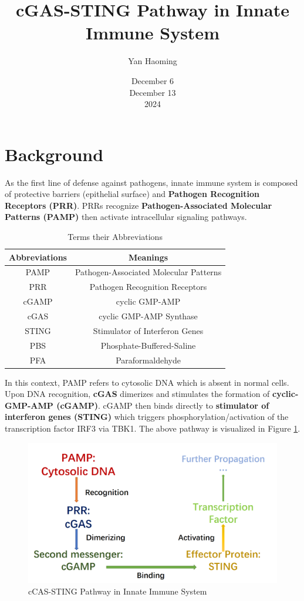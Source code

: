 \documentclass[UTF-8]{article}
\title{cGAS-STING Pathway in Innate Immune System}
\author{Yan Haoming}
\date{December 6\\ December 13\\ 2024}
\begin{document}
\maketitle

\section{Background}
As the first line of defense against pathogens, innate immune system is composed of protective barriers (epithelial surface) and \textbf{Pathogen Recognition Receptors (PRR)}\cite{TheCell}.
PRRs recognize \textbf{Pathogen-Associated Molecular Patterns (PAMP)} then activate intracellular signaling pathways.

\begin{table}[h]
    \centering
    \begin{tabular}{|c|c|}\hline
        \textbf{Abbreviations} & \textbf{Meanings} \\ \hline
        PAMP & Pathogen-Associated Molecular Patterns\\ \hline
        PRR & Pathogen Recognition Receptors \\ \hline
        cGAMP & cyclic GMP-AMP \\ \hline
        cGAS & cyclic GMP-AMP Synthase\\ \hline
        STING & Stimulator of Interferon Genes\\ \hline
        PBS & Phosphate-Buffered-Saline\\ \hline
        PFA & Paraformaldehyde\\ \hline
    
    \end{tabular}
    \caption{Terms their Abbreviations}
    \label{Terms}
\end{table}

In this context, PAMP refers to cytosolic DNA which is absent in normal cells.
Upon DNA recognition, \textbf{cGAS} dimerizes and stimulates the formation of \textbf{cyclic-GMP-AMP (cGAMP)}. cGAMP then binds directly to \textbf{stimulator of interferon genes (STING)} which triggers phosphorylation/activation of the transcription factor IRF3 via TBK1\cite{cGAS-wiki}.
The above pathway is visualized in Figure \ref{landscape}.

\begin{figure}[h]
    \centering
    \includegraphics[width=0.7\linewidth]{../Figures/landscape.png}
    \caption{cCAS-STING Pathway in Innate Immune System}
    \label{landscape}
\end{figure}
\end{document}
